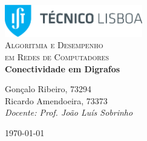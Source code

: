 \begin{titlepage}

	\begin{center}

		\includegraphics[width=6cm]{./logoIST}\\[2.5cm]

		\textsc{\LARGE Algoritmia e Desempenho\\[5mm]
		em Redes de Computadores}\\[2cm]

		{ \huge \bfseries Conectividade em Digrafos \\[2.5cm] }


		\noindent
		\begin{center} \Large
			Gonçalo Ribeiro, 73294\\[5mm]

			Ricardo Amendoeira, 73373\\[4.5cm]

			\textit{Docente: Prof. João Luís Sobrinho}

		\end{center}

		\vfill

		{\large \today}


	\end{center}

\end{titlepage}